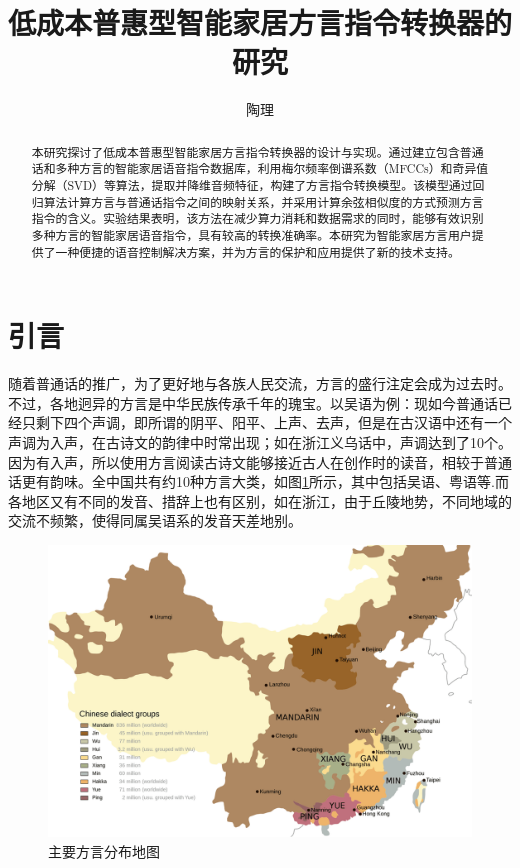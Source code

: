 \documentclass[lang=cn,cite=super]{elegantpaper}
\title{低成本普惠型智能家居方言指令转换器的研究}
\author{陶理}
\date{}
\begin{document}
\maketitle
\begin{abstract}
    本研究探讨了低成本普惠型智能家居方言指令转换器的设计与实现。通过建立包含普通话和多种方言的智能家居语音指令数据库，利用梅尔频率倒谱系数（MFCCs）和奇异值分解（SVD）等算法，提取并降维音频特征，构建了方言指令转换模型。该模型通过回归算法计算方言与普通话指令之间的映射关系，并采用计算余弦相似度的方式预测方言指令的含义。实验结果表明，该方法在减少算力消耗和数据需求的同时，能够有效识别多种方言的智能家居语音指令，具有较高的转换准确率。本研究为智能家居方言用户提供了一种便捷的语音控制解决方案，并为方言的保护和应用提供了新的技术支持。
\end{abstract}
\setcounter{section}{-1}
\section{引言}
随着普通话的推广，为了更好地与各族人民交流，方言的盛行注定会成为过去时。不过，各地迥异的方言是中华民族传承千年的瑰宝。以吴语为例：现如今普通话已经只剩下四个声调，即所谓的阴平、阳平、上声、去声，但是在古汉语中还有一个声调为入声，在古诗文的韵律中时常出现；如在浙江义乌话中，声调达到了10个。因为有入声，所以使用方言阅读古诗文能够接近古人在创作时的读音，相较于普通话更有韵味。全中国共有约10种方言大类，如图\ref{fig:chinese-lanaguages-map}所示，其中包括吴语、粤语等.而各地区又有不同的发音、措辞上也有区别，如在浙江，由于丘陵地势，不同地域的交流不频繁，使得同属吴语系的发音天差地别。
\begin{figure}[h]
    \caption{\label{fig:chinese-lanaguages-map}主要方言分布地图}
    \centering
    \includegraphics[scale=0.3]{chinese-lanaguages-map.png}
\end{figure}
\end{document}
